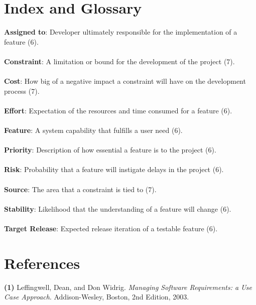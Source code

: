 \documentclass{article}
\begin{document}
\section{Index and Glossary}
\textbf{Assigned to}: Developer ultimately responsible for the implementation of a feature (6).\\ \\
\textbf{Constraint}: A limitation or bound for the development of the project (7).\\ \\
\textbf{Cost}: How big of a negative impact a constraint will have on the development process (7).\\ \\
\textbf{Effort}: Expectation of the resources and time consumed for a feature (6).\\ \\
\textbf{Feature}: A system capability that fulfills a user need (6).\\ \\
\textbf{Priority}: Description of how essential a feature is to the project (6).\\ \\
\textbf{Risk}: Probability that a feature will instigate delays in the project (6).\\ \\
\textbf{Source}: The area that a constraint is tied to (7).\\ \\
\textbf{Stability}: Likelihood that the understanding of a feature will change (6).\\ \\
\textbf{Target Release}: Expected release iteration of a testable feature (6).

\section{References}
\hangindent=1.4cm
\textbf{(1)} Leffingwell, Dean, and Don Widrig.
\emph{Managing Software Requirements: a Use Case Approach}.
Addison-Wesley, Boston,
2nd Edition,
2003.
\end{document}
